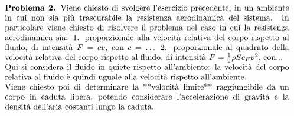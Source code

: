 \documentclass[letterpaper,10pt,italian]{jupyterBook}
\begin{document}
\sphinxAtStartPar
{}
\begin{align*}\!\begin{aligned}
\begin{minipage}[t]{1.\textwidth}
  \vspace{0pt}
  \textbf{Problema 2.}
Viene chiesto di svolgere l'esercizio precedente, in un ambiente in cui non sia più trascurabile la resistenza aerodinamica del sistema.
In particolare viene chiesto di risolvere il problema nel caso in cui la resistenza aerodinamica sia:
1. proporzionale alla velocità relativa del corpo rispetto al fluido, di intensità $F = c v$, con $c = \dots$
2. proporzionale al quadrato della velocità relativa del corpo rispetto al fluido, di intensità $F = \frac{1}{2} \rho S c_F v^2$, con...\\
Qui si considera il fluido in quiete rispetto all'ambiente: la velocità del corpo relativa al fluido è quindi uguale alla velocità rispetto all'ambiente.\\
Viene chiesto poi di determinare la **velocità limite** raggiungibile da un corpo in caduta libera, potendo considerare l'accelerazione di gravità e la densità dell'aria costanti lungo la caduta.\\
\end{minipage}\\
\end{aligned}\end{align*}
\sphinxAtStartPar
{}
\end{document}

